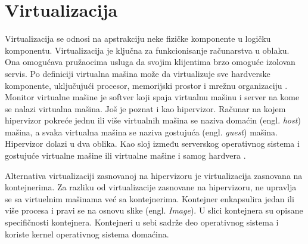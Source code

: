 \documentclass[12pt,oneside]{memoir}
\begin{document}

\section{Virtualizacija}
Virtualizacija se odnosi na apstrakciju neke fizičke komponente u logičku komponentu. Virtualizacija je ključna za funkcionisanje računarstva u oblaku. Ona omogućava pružaocima usluga da svojim klijentima brzo omoguće izolovan servis. Po definiciji virtualna mašina može da virtualizuje sve hardverske komponente, uključujući procesor, memorijski prostor i mrežnu organizaciju \cite{ve}. Monitor virtualne mašine je softver koji spaja virtualnu mašinu i server na kome se nalazi virtualna mašina. Još je poznat i kao hipervizor. Računar na kojem hipervizor pokreće jednu ili više virtualnih mašina se naziva domaćin (engl. \emph{host}) mašina, a svaka virtualna mašina se naziva gostujuća (engl. \emph{guest}) mašina. Hipervizor dolazi u dva oblika. Kao sloj između serverskog operativnog sistema i gostujuće virtualne mašine ili virtualne mašine i samog hardvera \cite{ve}.


Alternativa virtualizaciji zasnovanoj na hipervizoru je virtualizacija zasnovana na kontejnerima. Za razliku od virtualizacije zasnovane na hipervizoru, ne upravlja se sa virtuelnim mašinama već sa kontejnerima. Kontejner enkapsulira jedan ili više procesa i pravi se na osnovu slike (engl. \emph{Image}). U slici kontejnera su opisane specifičnosti kontejnera. Kontejneri u sebi sadrže deo operativnog sistema i koriste kernel operativnog sistema domaćina.
\end{document}
